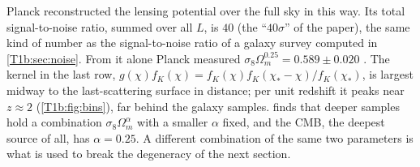 Planck reconstructed the lensing potential over the full sky in this way. Its total signal-to-noise ratio, summed over all $L$, is $40$ (the ``$40\sigma$'' of the paper), the same kind of number as the signal-to-noise ratio of a galaxy survey computed in \cref{T1b:sec:noise}. From it alone Planck measured $\sigma_8\Omega_m^{0.25}=0.589\pm0.020$ \cite{Planck2018VIII}. The kernel in the last row, $g(\chi)f_K(\chi)=f_K(\chi)f_K(\chi_*-\chi)/f_K(\chi_*)$, is largest midway to the last-scattering surface in distance; per unit redshift it peaks near $z\approx2$ (\cref{T1b:fig:bins}), far behind the galaxy samples.  finds that deeper samples hold a combination $\sigma_8\Omega_m^\alpha$ with a smaller $\alpha$ fixed, and the CMB, the deepest source of all, has $\alpha=0.25$. A different combination of the same two parameters is what is used to break the degeneracy of the next section.

